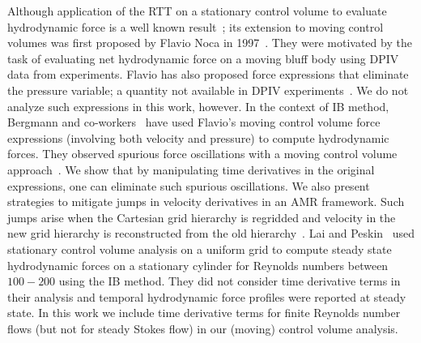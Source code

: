\documentclass[review]{elsarticle}
\begin{document}
Although application of the RTT on a stationary control volume to evaluate 
hydrodynamic force is a well known result~\cite{Kundu14,Pozrikidis11}; 
its extension to moving control volumes was first proposed by Flavio
Noca in 1997~\cite{Noca97}. They were motivated by the task of evaluating 
net hydrodynamic force on a moving bluff body using DPIV data 
from experiments. Flavio has also proposed force expressions 
that eliminate the pressure variable; a quantity not available 
in DPIV experiments~\cite{Noca97,Noca99}. We do not analyze 
such expressions in this work, however. In the context of IB method, 
Bergmann and co-workers~\cite{Bergmann11,Bergmann16} have 
used Flavio's moving control volume force expressions (involving both 
velocity and pressure) to compute hydrodynamic forces. They  
observed spurious force oscillations with a moving control volume approach~\cite{Bergmann11}. 
We show that by manipulating time derivatives in the original expressions, one 
can eliminate such spurious oscillations. We also present strategies to 
mitigate jumps in velocity derivatives in an AMR framework. Such jumps 
arise when the Cartesian grid hierarchy is regridded and velocity in the new grid hierarchy 
is reconstructed from the old hierarchy~\cite{Griffith07}. Lai and Peskin~\cite{Lai00} used stationary
control volume analysis on a uniform grid to compute steady state hydrodynamic forces on a stationary 
cylinder for Reynolds numbers between $100-200$ using the IB method. They did not 
consider time derivative terms in their analysis and temporal hydrodynamic force profiles 
were reported at steady state. In this work we include time derivative terms for 
finite Reynolds number flows (but not for steady Stokes flow) in our (moving) control volume 
analysis. 
\end{document}
